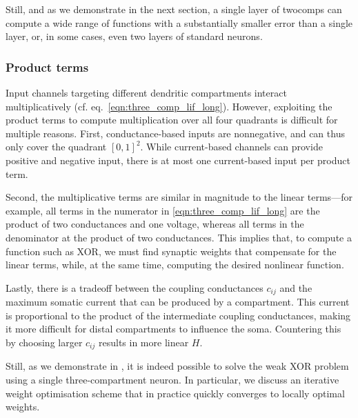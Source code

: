 Still, and as we demonstrate in the next section, a single layer of \gls{twocomp}s can compute a wide range of functions with a substantially smaller error than a single layer, or, in some cases, even two layers of standard \LIF neurons.

\subsubsection{Product terms}
Input channels targeting different dendritic compartments interact multiplicatively (cf. eq.~\ref{eqn:three_comp_lif_long}).
However, exploiting the product terms to compute multiplication over all four quadrants is difficult for multiple reasons.
First, conductance-based inputs are nonnegative, and can thus only cover the quadrant $[0, 1]^2$.
While current-based channels can provide positive and negative input, there is at most one current-based input per product term.

Second, the multiplicative terms are similar in magnitude to the linear terms---for example, all terms in the numerator in \cref{eqn:three_comp_lif_long} are the product of two conductances and one voltage, whereas all terms in the denominator at the product of two conductances.
This implies that, to compute a function such as XOR, we must find synaptic weights that compensate for the linear terms, while, at the same time, computing the desired nonlinear function.

Lastly, there is a tradeoff between the coupling conductances $c_{ij}$ and the maximum somatic current that can be produced by a compartment.
This current is proportional to the product of the intermediate coupling conductances, making it more difficult for distal compartments to influence the soma.
Countering this by choosing larger $c_{ij}$ results in more linear $H$.

Still, as we demonstrate in , it is indeed possible to solve the weak XOR problem using a single three-compartment neuron.
In particular, we discuss an iterative weight optimisation scheme that in practice quickly converges to locally optimal weights.

